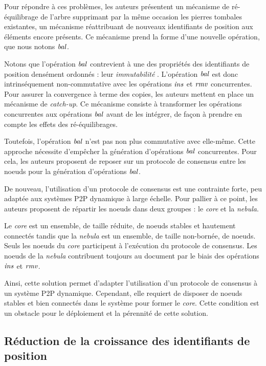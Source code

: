 Pour répondre à ces problèmes, les auteurs présentent un mécanisme de ré-équilibrage de l'arbre supprimant par la même occasion les pierres tombales existantes, \ie un mécanisme réattribuant de nouveaux identifiants de position aux éléments encore présents.
Ce mécanisme prend la forme d'une nouvelle opération, que nous notons $\mathit{bal}$.

Notons que l'opération $\mathit{bal}$ contrevient à une des propriétés des identifiants de position densément ordonnés : leur \emph{immutabilité} .
L'opération $\mathit{bal}$ est donc intrinséquement non-commutative avec les opérations $\mathit{ins}$ et $\mathit{rmv}$ concurrentes.
Pour assurer la convergence à terme des copies, les auteurs mettent en place un mécanisme de \emph{catch-up}.
Ce mécanisme consiste à transformer les opérations concurrentes aux opérations $\mathit{bal}$ avant de les intégrer, de façon à prendre en compte les effets des ré-équilibrages.

Toutefois, l'opération $\mathit{bal}$ n'est pas non plus commutative avec elle-même.
Cette approche nécessite d'empêcher la génération d'opérations $\mathit{bal}$ concurrentes.
Pour cela, les auteurs proposent de reposer sur un protocole de consensus entre les noeuds pour la génération d'opérations $\mathit{bal}$.

De nouveau, l'utilisation d'un protocole de consensus est une contrainte forte, peu adaptée aux systèmes \ac{P2P} dynamique à large échelle.
Pour pallier à ce point, les auteurs proposent de répartir les noeuds dans deux groupes : le \emph{core} et la \emph{nebula}.

Le \emph{core} est un ensemble, de taille réduite, de noeuds stables et hautement connectés tandis que la \emph{nebula} est un ensemble, de taille non-bornée, de noeuds.
Seuls les noeuds du \emph{core} participent à l'exécution du protocole de consensus.
Les noeuds de la \emph{nebula} contribuent toujours au document par le biais des opérations $\mathit{ins}$ et $\mathit{rmv}$.

Ainsi, cette solution permet d'adapter l'utilisation d'un protocole de consensus à un système \ac{P2P} dynamique.
Cependant, elle requiert de disposer de noeuds stables et bien connectés dans le système pour former le \emph{core}.
Cette condition est un obstacle pour le déploiement et la pérennité de cette solution.

\subsection{Réduction de la croissance des identifiants de position}
\label{sec:etat-art-lseq}

